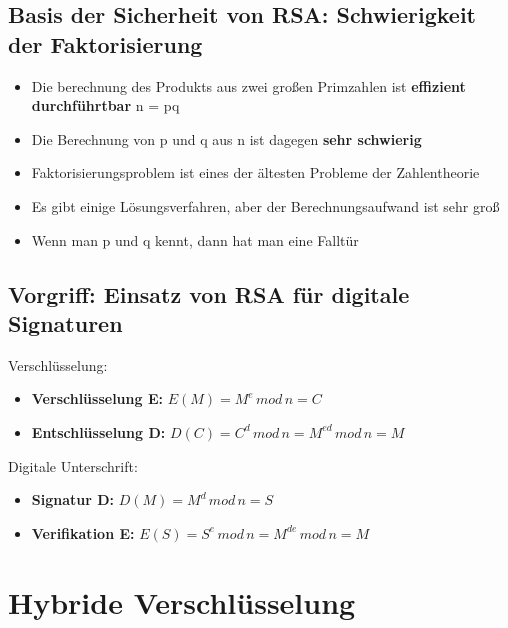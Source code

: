 \documentclass[openany]{book}
\begin{document}
\subsection{Basis der Sicherheit von RSA: Schwierigkeit der Faktorisierung}

\begin{itemize}
    \item Die berechnung des Produkts aus zwei großen Primzahlen ist \textbf{effizient durchführtbar} n = pq
    \item Die Berechnung von p und q aus n ist dagegen \textbf{sehr schwierig}
    \item Faktorisierungsproblem ist eines der ältesten Probleme der Zahlentheorie 
    \item Es gibt einige Lösungsverfahren, aber der Berechnungsaufwand ist sehr groß
    \item Wenn man p und q kennt, dann hat man eine Falltür
\end{itemize}

\subsection{Vorgriff: Einsatz von RSA für digitale Signaturen}

Verschlüsselung:
\begin{itemize}
    \item \textbf{Verschlüsselung E:} $E(M)=M^e\, mod\, n=C$
    \item \textbf{Entschlüsselung D:} $D(C)=C^d\, mod\, n=M^{ed} \, mod\, n=M$
\end{itemize}

Digitale Unterschrift:
\begin{itemize}
    \item \textbf{Signatur D:} $D(M)=M^d\, mod\, n=S$
    \item \textbf{Verifikation E:} $E(S)=S^e\, mod\, n=M^{de}\, mod\, n=M$ 
\end{itemize}

\section{Hybride Verschlüsselung}
\end{document}
